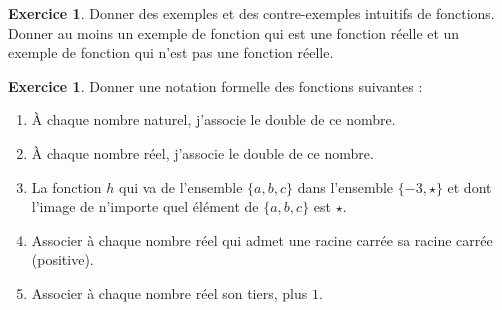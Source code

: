 \documentclass[a4paper,13pt]{scrreprt}
\theoremstyle{plain}
\theoremstyle{definition}
\newtheorem{exo}[subsection]{Exercice}
\begin{document}
\begin{exo} \label{exof2}
	Donner des exemples et des contre-exemples intuitifs de fonctions. Donner au moins un exemple de fonction qui est une fonction réelle et un exemple de fonction qui n'est pas une fonction réelle.
\end{exo}

\begin{exo} \label{exof3}
	Donner une notation formelle des fonctions suivantes :
	\begin{enumerate}
		\item À chaque nombre naturel, j'associe le double de ce nombre.
		\item À chaque nombre réel, j'associe le double de ce nombre.
		\item La fonction $h$ qui va de l'ensemble $\{a,b,c\}$ dans l'ensemble $\{-3,\star\}$ et dont l'image de n'importe quel élément de $\{a,b,c\}$ est $\star$.
		\item Associer à chaque nombre réel qui admet une racine carrée sa racine carrée (positive).
		\item Associer à chaque nombre réel son tiers, plus $1$.
	\end{enumerate}
\end{exo}
\end{document}
